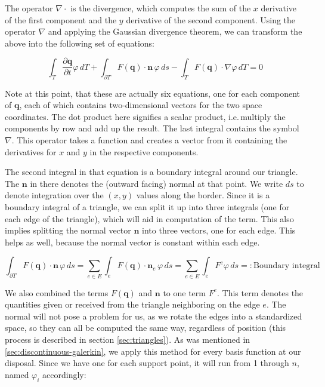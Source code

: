 \documentclass{article}
\newcommand{\pd}[2]{\dfrac{\partial #1}{\partial #2}}
\renewcommand{\phi}{\varphi}
\begin{document}
The operator $\nabla \cdot$ is the divergence, which computes the sum of the $x$ derivative of the first component and the $y$ derivative of the second component. Using the operator $\nabla$ and applying the Gaussian divergence theorem, we can transform the above into the following set of equations:

\begin{equation}
  \label{eq:shallow-water-weak-form-div-applied}
  \int_T \pd {\mathbf{q}}{t} \phi \, dT +
  \int_{\partial T} F(\mathbf{q}) \cdot \mathbf{n} \, \phi \, ds -
  \int_T F(\mathbf{q}) \cdot \nabla \phi \, dT = 0
\end{equation}

Note at this point, that these are actually six equations, one for each component of $\mathbf{q}$, each of which contains two-dimensional vectors for the two space coordinates. The dot product here signifies a scalar product, i.e.\,multiply the components by row and add up the result. The last integral contains the symbol $\nabla$. This operator takes a function and creates a vector from it containing the derivatives for $x$ and $y$ in the respective components.

The second integral in that equation is a boundary integral around our triangle. The $\mathbf{n}$ in there denotes the (outward facing) normal at that point. We write $ds$ to denote integration over the $(x,y)$ values along the border. Since it is a boundary integral of a triangle, we can split it up into three integrals (one for each edge of the triangle), which will aid in computation of the term. This also implies splitting the normal vector $\mathbf{n}$ into three vectors, one for each edge. This helps as well, because the normal vector is constant within each edge.

\begin{equation}
  \label{eq:boundary-integral-sum}
  \int_{\partial T} F(\mathbf{q}) \cdot \mathbf{n} \, \phi \, ds = \sum_{e \in E} \int_{e} F(\mathbf{q}) \cdot \mathbf{n}_e \, \phi \, ds = \sum_{e \in E} \int_{e} F^e \phi \, ds =: \text{Boundary integral}
\end{equation}

We also combined the terms $F(\mathbf{q})$ and $\mathbf{n}$ to one term $F^e$. This term denotes the quantities given or received from the triangle neighboring on the edge $e$. The normal will not pose a problem for us, as we rotate the edges into a standardized space, so they can all be computed the same way, regardless of position (this process is described in section \ref{sec:triangles}). As was mentioned in \ref{sec:discontinuous-galerkin}, we apply this method for every basis function at our disposal. Since we have one for each support point, it will run from 1 through $n$, named $\phi_i$ accordingly:
\end{document}
